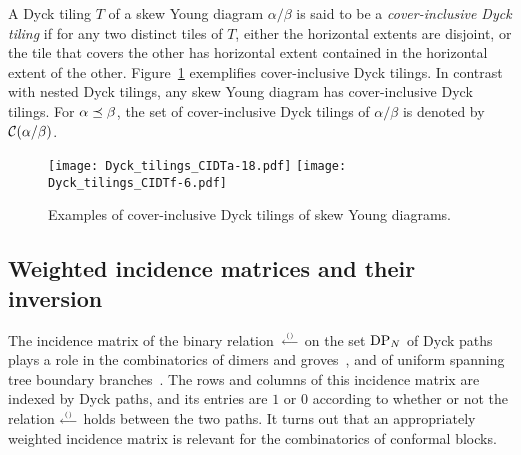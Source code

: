 \documentclass[oneside,english]{amsart}
\numberwithin{equation}{section}
\numberwithin{figure}{section}
\theoremstyle{plain}
\theoremstyle{plain}
\theoremstyle{plain}
\theoremstyle{remark}
\theoremstyle{plain}
\theoremstyle{plain}
\theoremstyle{plain}
\theoremstyle{plain}
\theoremstyle{plain}
\theoremstyle{plain}
\theoremstyle{plain}
\theoremstyle{plain}
\newcommand{\blue}[1]{{\color{blue} #1}}
\newcommand{\green}[1]{{\color{green} #1}}
\begin{document}
A Dyck tiling $T$ of a skew Young diagram $\alpha/\beta$ is said to be a \emph{cover-inclusive
Dyck tiling} if for any two distinct tiles of $T$, either the horizontal
extents are disjoint, or the tile that covers the other has horizontal extent contained in the horizontal
extent of the other. Figure~\ref{fig: CIDT examples} exemplifies cover-inclusive
Dyck tilings. In contrast with nested Dyck tilings, any skew Young diagram 
has cover-inclusive Dyck tilings.
For $\alpha \preceq \beta$, the set of cover-inclusive Dyck tilings of $\alpha/\beta$ is
denoted by $\mathcal{C} (\alpha/\beta)$.
%
\begin{figure}
\texttt{[image: Dyck\_tilings\_CIDTa-18.pdf]} \quad
\texttt{[image: Dyck\_tilings\_CIDTf-6.pdf]} \\
\caption{\label{fig: CIDT examples} Examples of cover-inclusive Dyck tilings of skew Young diagrams.}
\end{figure}

\subsection{Weighted incidence matrices and their inversion}

The incidence matrix of the binary relation~$\stackrel{\scriptscriptstyle{()}}{\scriptstyle{\longleftarrow}}$ on the set $\mathrm{DP}_N$ of Dyck paths
plays a role in the combinatorics of dimers and groves~\cite{KW-double_dimer_pairings_and_skew_Young_diagrams},
and of uniform spanning tree boundary branches~\cite{KKP-boundary_correlations_in_planar_LERW_and_UST}.
The rows and columns of this incidence matrix are indexed by Dyck paths, and its entries
are $1$ or $0$ 
according to whether 
or not
the relation $\stackrel{\scriptscriptstyle{()}}{\scriptstyle{\longleftarrow}}$ holds between the two paths.
It turns out that an appropriately weighted incidence matrix is relevant for the combinatorics of conformal blocks. 
\end{document}
